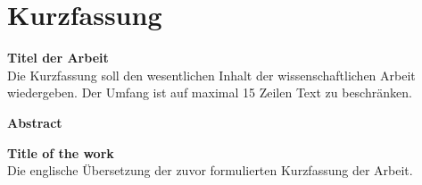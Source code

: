 \chapter*{Kurzfassung}
\thispagestyle{empty}
\vspace{0cm}

\textbf{\large Titel der Arbeit}\\

Die Kurzfassung soll den wesentlichen Inhalt der wissenschaftlichen Arbeit wiedergeben. Der Umfang ist auf maximal 15 Zeilen Text zu beschränken.\\
\vspace{2cm}



{\bfseries \sffamily \huge Abstract}
\vspace{1cm}

\textbf{\large Title of the work}\\

Die englische Übersetzung der zuvor formulierten Kurzfassung der Arbeit.